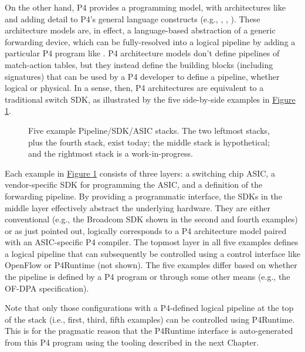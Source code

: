 \documentclass[letterpaper,11pt,english]{sphinxmanual}
\let\sphinxpxdimen\pdfpxdimen\else\newdimen\sphinxpxdimen
\begin{document}
On the other hand, P4 provides a programming model, with architectures
like  and  adding detail to P4’s general
language constructs (e.g., , , ). These
architecture models are, in effect, a language-based abstraction of a
generic forwarding device, which can be fully-resolved into a logical
pipeline by adding a particular P4 program like . P4
architecture models don’t define pipelines of match-action tables, but
they instead define the building blocks (including signatures) that
can be used by a P4 developer to define a pipeline, whether logical or
physical. In a sense, then, P4 architectures are equivalent to a
traditional switch SDK, as illustrated by the five side-by-side
examples in \hyperref[\detokenize{switch:fig-compare}]{Figure \ref{\detokenize{switch:fig-compare}}}.

\begin{figure}[htbp]
\centering
\capstart

\noindent\sphinxincludegraphics[width=800\sphinxpxdimen]{{Slide23}.png}
\caption{Five example Pipeline/SDK/ASIC stacks. The two leftmost stacks,
plus the fourth stack, exist today; the middle stack is
hypothetical; and the rightmost stack is a work-in-progress.}\label{\detokenize{switch:id17}}\label{\detokenize{switch:fig-compare}}\end{figure}

Each example in \hyperref[\detokenize{switch:fig-compare}]{Figure \ref{\detokenize{switch:fig-compare}}} consists of three
layers: a switching chip ASIC, a vendor-specific SDK for programming
the ASIC, and a definition of the forwarding pipeline. By providing a
programmatic interface, the SDKs in the middle layer effectively
abstract the underlying hardware. They are either conventional (e.g.,
the Broadcom SDK shown in the second and fourth examples) or as just
pointed out, logically corresponds to a P4 architecture model paired
with an ASIC-specific P4 compiler.  The topmost layer in all five
examples defines a logical pipeline that can subsequently be
controlled using a control interface like OpenFlow or P4Runtime (not
shown). The five examples differ based on whether the pipeline is
defined by a P4 program or through some other means (e.g., the OF-DPA
specification).

Note that only those configurations with a P4-defined logical pipeline
at the top of the stack (i.e., first, third, fifth examples) can be
controlled using P4Runtime. This is for the pragmatic reason that the
P4Runtime interface is auto-generated from this P4 program using the
tooling described in the next Chapter.
\end{document}
